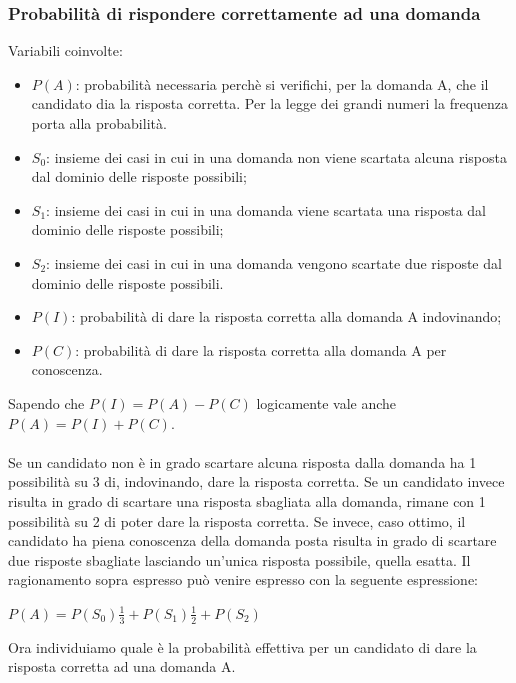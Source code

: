 \subsubsection{Probabilit\`a di rispondere correttamente ad una domanda}
\label{Probabilita di rispondere correttamente ad una domanda}
Variabili coinvolte:
\begin{itemize}
\item $P(A)$: probabilit\`a necessaria perch\`e si verifichi, per la domanda A, che il candidato dia la risposta corretta.  Per la legge dei grandi numeri la frequenza porta alla probabilit\`a.
\item $S_{0}$: insieme dei casi in cui in una domanda non viene scartata alcuna risposta dal dominio delle risposte possibili;
\item $S_{1}$: insieme dei casi in cui in una domanda viene scartata una risposta dal dominio delle risposte possibili;
\item $S_{2}$: insieme dei casi in cui in una domanda vengono scartate due risposte dal dominio delle risposte possibili.
\item $P(I)$:  probabilit\`a di dare la risposta corretta alla domanda A indovinando;
\item $P(C)$: probabilit\`a di dare la risposta corretta alla domanda A per conoscenza.
\end{itemize}

\noindent
Sapendo che $P(I)=P(A)-P(C)$ logicamente vale anche $P(A)=P(I)+P(C)$.\\\\
Se un candidato non \`e in grado scartare alcuna risposta dalla domanda ha 1 possibilit\`a su 3 di, indovinando, dare la risposta corretta. Se un candidato invece risulta in grado di scartare una risposta sbagliata alla domanda, rimane con 1 possibilit\`a  su 2 di poter dare la risposta corretta. Se invece, caso ottimo, il candidato ha piena conoscenza della domanda posta risulta in grado di scartare due risposte sbagliate lasciando un'unica risposta possibile, quella esatta.
Il ragionamento sopra espresso pu\`o venire espresso con la seguente espressione:

\begin{center}$P(A)=P(S_{0})\frac{1}{3}+P(S_{1})\frac{1}{2}+P(S_{2})$\end{center} 


\noindent
Ora individuiamo quale \`e la probabilit\`a effettiva per un candidato di dare la risposta corretta ad una domanda A. \\

